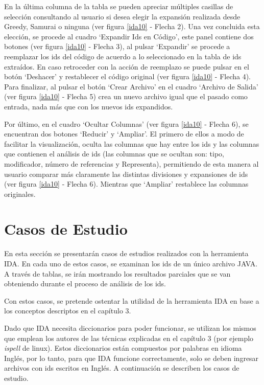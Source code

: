 \documentclass[a4paper,12pt]{report}
\begin{document}
En la última columna de la tabla se pueden apreciar múltiples casillas de selección consultando al usuario si desea elegir la expansión realizada desde Greedy, Samurai o ninguna (ver figura \ref{ida10} - Flecha 2). Una vez concluida esta elección, se procede al cuadro `Expandir Ids en Código', este panel contiene dos botones (ver figura \ref{ida10} - Flecha 3), al pulsar `Expandir' se procede a reemplazar los ids del código de acuerdo a lo seleccionado en la tabla de ids extraídos. En caso retroceder con la acción de reemplazo se puede pulsar en el botón `Deshacer' y restablecer el código original (ver figura \ref{ida10} - Flecha 4). Para finalizar, al pulsar el botón `Crear Archivo' en el cuadro `Archivo de Salida' (ver figura \ref{ida10} - Flecha 5) crea un nuevo archivo igual que el pasado como entrada, nada más que con los nuevos ids expandidos.

Por último, en el cuadro `Ocultar Columnas' (ver figura \ref{ida10} - Flecha 6), se encuentran dos botones `Reducir' y `Ampliar'. El primero de ellos a modo de facilitar la visualización, oculta las columnas que hay entre los ids y las columnas que contienen el análisis de ids (las columnas que se ocultan son: tipo, modificador, número de referencias y Representa), permitiendo de esta manera al usuario comparar más claramente las distintas divisiones y expansiones de ids (ver figura \ref{ida10} - Flecha 6). Mientras que `Ampliar' restablece las columnas originales.

\section{Casos de Estudio}

En esta sección se presentarán casos de estudios realizados con la herramienta IDA. En cada uno de estos casos, se examinan los ids de un único archivo JAVA. A través de tablas, se irán mostrando los resultados parciales que se van obteniendo durante el proceso de análisis de los ids.

Con estos casos, se pretende ostentar la utilidad de la herramienta IDA en base a los conceptos descriptos en el capítulo 3.

Dado que IDA necesita diccionarios para poder funcionar, se utilizan los mismos que emplean los autores de las técnicas explicadas en el capítulo 3 (por ejemplo \textit{ispell} de linux). Estos diccionarios están compuestos por palabras en idioma Inglés, por lo tanto, para que IDA funcione correctamente, solo se deben ingresar archivos con ids escritos en Inglés. A continuación se describen los casos de estudio.
\end{document}
